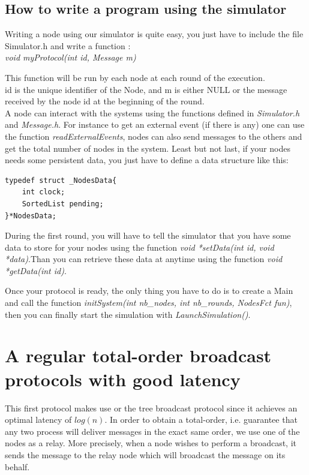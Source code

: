\documentclass[a4paper]{article}
\begin{document}
\subsection{How to write a program using the simulator}
Writing a node using our simulator is quite easy, you just have to 
include the file Simulator.h and write a function :\\
\textit{void myProtocol(int id, Message m)}

This function will be run by each node at each round of the execution.\\
id is the unique identifier of the Node, and m is either NULL or the
message received by the node id at the beginning of the round.\\
A node can interact with the systems using the functions defined in
\textit{Simulator.h} and \textit{Message.h}. For instance to get an external event
(if there is any) one can use the function \textit{readExternalEvents},
nodes can also send messages to the others and get the total number of
nodes in the system. Least but not last, if your nodes needs some
persistent data, you just have to define a data structure like this:\\
\begin{verbatim}
typedef struct _NodesData{
    int clock;
    SortedList pending;
}*NodesData;
\end{verbatim}
During the first round, you will have to tell the simulator that you
have some data to store for your nodes using the function \textit{void *setData(int id,
void *data)}.Than you can retrieve these data at anytime using the function
\textit{void *getData(int id)}.

Once your protocol is ready, the only thing you have to do is to create
a Main and call the function \textit{initSystem(int nb\_nodes, int
nb\_rounds, NodesFct fun)}, then you can finally start the simulation
with \textit{LaunchSimulation()}. 

\section{A regular total-order broadcast protocols with good latency}
\label{sec:latencyTO}

This first protocol makes use or the tree broadcast protocol since it achieves
an optimal latency of $log(n)$. In order to obtain a total-order, i.e.
guarantee that any two process will deliver messages in the exact same order,
we use one of the nodes as a relay. More precisely, when a node wishes to
perform a broadcast, it sends the message to the relay node which will
broadcast the message on its behalf.
\end{document}
